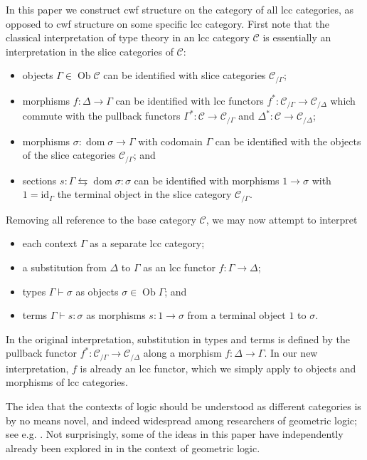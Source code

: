 \documentclass[a4paper]{article}
\theoremstyle{remark}
\theoremstyle{definition}
\begin{document}
In this paper we construct cwf structure on the category of all lcc categories, as opposed to cwf structure on some specific lcc category.
First note that the classical interpretation of type theory in an lcc category $\mathcal{C}$ is essentially an interpretation in the slice categories of $\mathcal{C}$:
\begin{itemize}
  \item
    objects $\Gamma \in \operatorname{Ob} \mathcal{C}$ can be identified with slice categories $\mathcal{C}_{/ \Gamma}$;
  \item
    morphisms $f : \Delta \rightarrow \Gamma$ can be identified with lcc functors $f^* : \mathcal{C}_{/ \Gamma} \rightarrow \mathcal{C}_{/ \Delta}$ which commute with the pullback functors $\Gamma^* : \mathcal{C} \rightarrow \mathcal{C}_{/ \Gamma}$ and $\Delta^* : \mathcal{C} \rightarrow \mathcal{C}_{/ \Delta}$;
  \item
    morphisms $\sigma : \operatorname{dom} \sigma \rightarrow \Gamma$ with codomain $\Gamma$ can be identified with the objects of the slice categories $\mathcal{C}_{/ \Gamma}$; and
  \item
    sections $s : \Gamma \leftrightarrows \operatorname{dom} \sigma : \sigma$ can be identified with morphisms $1 \rightarrow \sigma$ with $1 = \mathrm{id}_\Gamma$ the terminal object in the slice category $\mathcal{C}_{/ \Gamma}$.
\end{itemize}
Removing all reference to the base category $\mathcal{C}$, we may now attempt to interpret
\begin{itemize}
  \item
    each context $\Gamma$ as a separate lcc category;
  \item
    a substitution from $\Delta$ to $\Gamma$ as an lcc functor $f : \Gamma \rightarrow \Delta$;
  \item
    types $\Gamma \vdash \sigma$ as objects $\sigma \in \operatorname{Ob} \Gamma$; and
  \item
    terms $\Gamma \vdash s : \sigma$ as morphisms $s : 1 \rightarrow \sigma$ from a terminal object $1$ to $\sigma$.
\end{itemize}
In the original interpretation, substitution in types and terms is defined by the pullback functor $f^* : \mathcal{C}_{/ \Gamma} \rightarrow \mathcal{C}_{/ \Delta}$ along a morphism $f : \Delta \rightarrow \Gamma$.
In our new interpretation, $f$ is already an lcc functor, which we simply apply to objects and morphisms of lcc categories.

The idea that the contexts of logic should be understood as different categories is by no means novel, and indeed widespread among researchers of geometric logic; see e.g. \cite[section 4.5]{locales-and-toposes-as-spaces}.
Not surprisingly, some of the ideas in this paper have independently already been explored in \cite{au-sketches} in the context of geometric logic.
\end{document}
